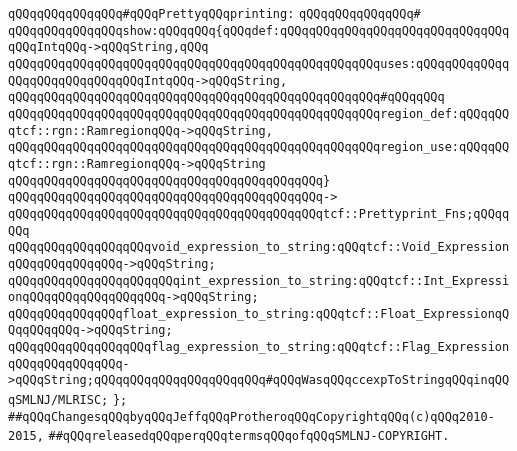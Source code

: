 \newline
\newline
\verb|qQQqqQQqqQQqqQQq#qQQqPrettyqQQqprinting:|\newline
\verb|qQQqqQQqqQQqqQQq#|\newline
\verb|qQQqqQQqqQQqqQQqshow:qQQqqQQq{qQQqdef:qQQqqQQqqQQqqQQqqQQqqQQqqQQqqQQqqQQqIntqQQq->qQQqString,qQQq|\newline
\verb|qQQqqQQqqQQqqQQqqQQqqQQqqQQqqQQqqQQqqQQqqQQqqQQqqQQquses:qQQqqQQqqQQqqQQqqQQqqQQqqQQqqQQqIntqQQq->qQQqString,|\newline
\verb|qQQqqQQqqQQqqQQqqQQqqQQqqQQqqQQqqQQqqQQqqQQqqQQqqQQq#qQQqqQQq|\newline
\verb|qQQqqQQqqQQqqQQqqQQqqQQqqQQqqQQqqQQqqQQqqQQqqQQqqQQqregion_def:qQQqqQQqtcf::rgn::RamregionqQQq->qQQqString,|\newline
\verb|qQQqqQQqqQQqqQQqqQQqqQQqqQQqqQQqqQQqqQQqqQQqqQQqqQQqregion_use:qQQqqQQqtcf::rgn::RamregionqQQq->qQQqString|\newline
\verb|qQQqqQQqqQQqqQQqqQQqqQQqqQQqqQQqqQQqqQQqqQQq}|\newline
\verb|qQQqqQQqqQQqqQQqqQQqqQQqqQQqqQQqqQQqqQQqqQQq->|\newline
\verb|qQQqqQQqqQQqqQQqqQQqqQQqqQQqqQQqqQQqqQQqqQQqtcf::Prettyprint_Fns;qQQqqQQq|\newline
\newline
\verb|qQQqqQQqqQQqqQQqqQQqvoid_expression_to_string:qQQqtcf::Void_ExpressionqQQqqQQqqQQqqQQq->qQQqString;|\newline
\verb|qQQqqQQqqQQqqQQqqQQqqQQqint_expression_to_string:qQQqtcf::Int_ExpressionqQQqqQQqqQQqqQQqqQQq->qQQqString;|\newline
\verb|qQQqqQQqqQQqqQQqfloat_expression_to_string:qQQqtcf::Float_ExpressionqQQqqQQqqQQq->qQQqString;|\newline
\verb|qQQqqQQqqQQqqQQqqQQqflag_expression_to_string:qQQqtcf::Flag_ExpressionqQQqqQQqqQQqqQQq->qQQqString;qQQqqQQqqQQqqQQqqQQqqQQq#qQQqWasqQQqccexpToStringqQQqinqQQqSMLNJ/MLRISC;|\newline
\verb|};|\newline
\newline
\verb|##qQQqChangesqQQqbyqQQqJeffqQQqProtheroqQQqCopyrightqQQq(c)qQQq2010-2015,|\newline
\verb|##qQQqreleasedqQQqperqQQqtermsqQQqofqQQqSMLNJ-COPYRIGHT.|\newline

